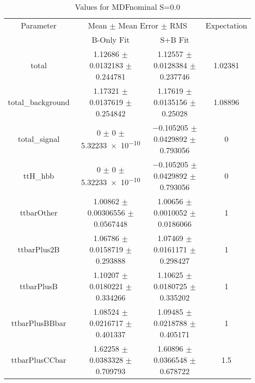 \begin{table}
\centering
\caption{Values for MDFnominal S=0.0}
\begin{tabular}{cccc}
\toprule
Parameter & \multicolumn{2}{c}{Mean $\pm$ Mean Error $\pm$ RMS} & Expectation\\
 & B-Only Fit & S+B Fit & \\
\midrule
total & \num{1.12686} $\pm$ \num{0.0132183} $\pm$ \num{0.244781} & \num{1.12557} $\pm$ \num{0.0128384} $\pm$ \num{0.237746} & \num{1.02381}\\
total\_background & \num{1.17321} $\pm$ \num{0.0137619} $\pm$ \num{0.254842} & \num{1.17619} $\pm$ \num{0.0135156} $\pm$ \num{0.25028} & \num{1.08896}\\
total\_signal & \num{0} $\pm$ \num{0} $\pm$ \num{5.32233e-10} & \num{-0.105205} $\pm$ \num{0.0429892} $\pm$ \num{0.793056} & \num{0}\\
ttH\_hbb & \num{0} $\pm$ \num{0} $\pm$ \num{5.32233e-10} & \num{-0.105205} $\pm$ \num{0.0429892} $\pm$ \num{0.793056} & \num{0}\\
ttbarOther & \num{1.00862} $\pm$ \num{0.00306556} $\pm$ \num{0.0567448} & \num{1.00656} $\pm$ \num{0.0010052} $\pm$ \num{0.0186066} & \num{1}\\
ttbarPlus2B & \num{1.06786} $\pm$ \num{0.0158719} $\pm$ \num{0.293888} & \num{1.07469} $\pm$ \num{0.0161171} $\pm$ \num{0.298427} & \num{1}\\
ttbarPlusB & \num{1.10207} $\pm$ \num{0.0180221} $\pm$ \num{0.334266} & \num{1.10625} $\pm$ \num{0.0180725} $\pm$ \num{0.335202} & \num{1}\\
ttbarPlusBBbar & \num{1.08524} $\pm$ \num{0.0216717} $\pm$ \num{0.401337} & \num{1.09485} $\pm$ \num{0.0218788} $\pm$ \num{0.405171} & \num{1}\\
ttbarPlusCCbar & \num{1.62258} $\pm$ \num{0.0383328} $\pm$ \num{0.709793} & \num{1.60896} $\pm$ \num{0.0366548} $\pm$ \num{0.678722} & \num{1.5}\\
\bottomrule
\end{tabular}
\end{table}